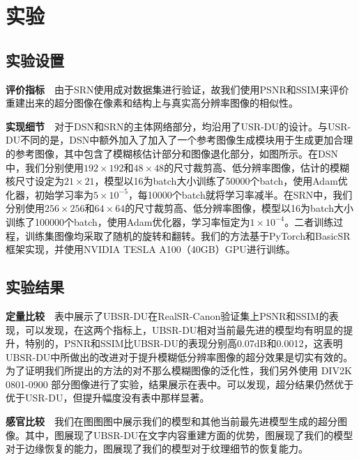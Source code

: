 \section{实验}
\subsection{实验设置}
\noindent\textbf{评价指标}\ \ 由于SRN使用成对数据集进行验证，故我们使用PSNR和SSIM来评价重建出来的超分图像在像素和结构上与真实高分辨率图像的相似性。

\noindent\textbf{实现细节}\ \ 对于DSN和SRN的主体网络部分，均沿用了USR-DU的设计。与USR-DU不同的是，DSN中额外加入了加入了一个参考图像生成模块用于生成更加合理的参考图像，其中包含了模糊核估计部分和图像退化部分，如图所示。在DSN中，我们分别使用$192\times192$和$48\times48$的尺寸裁剪高、低分辨率图像，估计的模糊核尺寸设定为$21\times21$，模型以16为batch大小训练了50000个batch，使用Adam优化器，初始学习率为$5\times10^{-5}$，每10000个batch就将学习率减半。在SRN中，我们分别使用$256\times256$和$64\times64$的尺寸裁剪高、低分辨率图像，模型以16为batch大小训练了100000个batch，使用Adam优化器，学习率恒定为$1\times10^{-4}$。二者训练过程，训练集图像均采取了随机的旋转和翻转。我们的方法基于PyTorch和BasicSR\parencite{basicsr}框架实现，并使用NVIDIA TESLA A100（40GB）GPU进行训练。
\subsection{实验结果}
\noindent\textbf{定量比较}\ \ 表中展示了UBSR-DU在RealSR-Canon验证集上PSNR和SSIM的表现，可以发现，在这两个指标上，UBSR-DU相对当前最先进的模型均有明显的提升，特别的，PSNR和SSIM比UBSR-DU的表现分别高0.07dB和0.0012，这表明UBSR-DU中所做出的改进对于提升模糊低分辨率图像的超分效果是切实有效的。为了证明我们所提出的方法的对不那么模糊图像的泛化性，我们另外使用 DIV2K 0801-0900 部分图像进行了实验，结果展示在表中。可以发现，超分结果仍然优于优于USR-DU，但提升幅度没有表中那样显著。

\noindent\textbf{感官比较}\ \ 我们在图图图中展示我们的模型和其他当前最先进模型生成的超分图像。其中，图展现了UBSR-DU在文字内容重建方面的优势，图展现了我们的模型对于边缘恢复的能力，图展现了我们的模型对于纹理细节的恢复能力。
